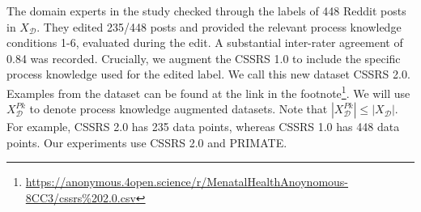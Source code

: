 \documentclass[letterpaper]{article} %
\begin{document}
The domain experts in the study checked through the labels of 448 Reddit posts in $X_{\mathcal{D}}$. They edited 235/448 posts and provided the relevant process knowledge conditions 1-6, evaluated during the edit. %
A substantial inter-rater agreement of 0.84 was recorded. Crucially, we augment the CSSRS 1.0 to include the specific process knowledge used for the edited label. We call this new dataset CSSRS 2.0. Examples from the dataset can be found at the link in the footnote\footnote{\url{https://anonymous.4open.science/r/MenatalHealthAnoynomous-8CC3/cssrs\%202.0.csv}}. We will use $X^{Pk}_{\mathcal{D}}$ to denote process knowledge augmented datasets. Note that $|X^{Pk}_{\mathcal{D}}| \leq |X_{\mathcal{D}}|$. For example, CSSRS 2.0 has 235 data points, whereas CSSRS 1.0 has 448 data points. Our experiments use CSSRS 2.0 and PRIMATE.
\end{document}
